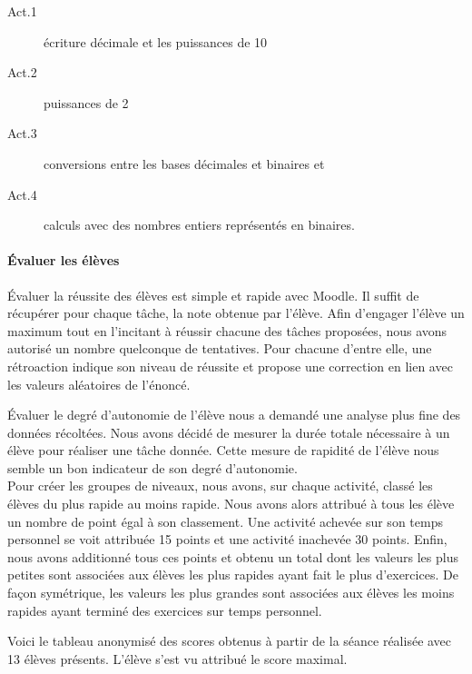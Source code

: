 \begin{description}
    \item[Act.1] écriture décimale et les puissances de 10
    \item[Act.2] puissances de 2
    \item[Act.3] conversions entre les bases décimales et binaires et 
    \item[Act.4] calculs avec des nombres entiers représentés en binaires.
\end{description}

\paragraph{Évaluer les élèves}%
%
Évaluer la réussite des élèves est simple et rapide avec Moodle. Il suffit de récupérer pour chaque tâche, la note obtenue par l'élève. Afin d'engager l'élève un maximum tout en l'incitant à réussir chacune des tâches proposées, nous avons autorisé un nombre quelconque de tentatives. Pour chacune d'entre elle, une rétroaction indique son niveau de réussite et propose une correction en lien avec les valeurs aléatoires de l'énoncé.

Évaluer le degré d'autonomie de l'élève nous a demandé une analyse plus fine des données récoltées. Nous avons décidé de mesurer la durée totale nécessaire à un élève pour réaliser une tâche donnée. Cette mesure de rapidité de l'élève nous semble un bon indicateur de son degré d'autonomie.
\\
Pour créer les groupes de niveaux, nous avons, sur chaque activité, classé les élèves du plus rapide au moins rapide. Nous avons alors attribué à tous les élève un nombre de point égal à son classement. Une activité achevée sur son temps personnel se voit attribuée 15 points et une activité inachevée 30 points.
Enfin, nous avons additionné tous ces points et obtenu un total dont les valeurs les plus petites sont associées aux élèves les plus rapides ayant fait le plus d'exercices. De façon symétrique, les valeurs les plus grandes sont associées aux élèves les moins rapides ayant terminé des exercices sur temps personnel.


Voici le tableau anonymisé des scores obtenus à partir de la séance réalisée avec 13 élèves présents. L'élève s'est vu attribué le score maximal. 

